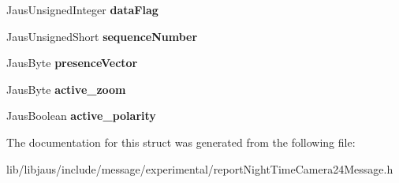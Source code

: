 \begin{DoxyCompactItemize}
\item 
\hypertarget{struct_report_night_time_camera24_message_struct_aa281e0092e459306bda7f93bf900300f}{\-Jaus\-Unsigned\-Integer {\bfseries data\-Flag}}\label{struct_report_night_time_camera24_message_struct_aa281e0092e459306bda7f93bf900300f}

\item 
\hypertarget{struct_report_night_time_camera24_message_struct_acfe27a6d3c9c419ff9a4f0d8a2569810}{\-Jaus\-Unsigned\-Short {\bfseries sequence\-Number}}\label{struct_report_night_time_camera24_message_struct_acfe27a6d3c9c419ff9a4f0d8a2569810}

\item 
\hypertarget{struct_report_night_time_camera24_message_struct_a27d7c6e5dab830d5b1b9ac5881177b28}{\-Jaus\-Byte {\bfseries presence\-Vector}}\label{struct_report_night_time_camera24_message_struct_a27d7c6e5dab830d5b1b9ac5881177b28}

\item 
\hypertarget{struct_report_night_time_camera24_message_struct_a3c380e65df72829ff6ef1275c784cac7}{\-Jaus\-Byte {\bfseries active\-\_\-zoom}}\label{struct_report_night_time_camera24_message_struct_a3c380e65df72829ff6ef1275c784cac7}

\item 
\hypertarget{struct_report_night_time_camera24_message_struct_a57fdb707dca2a1e1160e08d9f22c0ee4}{\-Jaus\-Boolean {\bfseries active\-\_\-polarity}}\label{struct_report_night_time_camera24_message_struct_a57fdb707dca2a1e1160e08d9f22c0ee4}

\end{DoxyCompactItemize}


\-The documentation for this struct was generated from the following file\-:\begin{DoxyCompactItemize}
\item 
lib/libjaus/include/message/experimental/report\-Night\-Time\-Camera24\-Message.\-h\end{DoxyCompactItemize}
